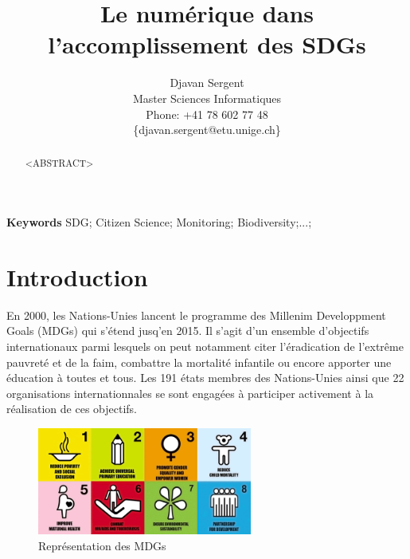 \documentclass[10pt, conference, compsocconf]{llncs}
\begin{document}
%
\title{Le numérique dans\\l'accomplissement des SDGs}





% 
\author{Djavan Sergent \\
Master Sciences Informatiques \\
Phone: +41 78 602 77 48 \\
 \{djavan.sergent@etu.unige.ch\}}




\maketitle


\begin{abstract}
	<ABSTRACT>
\end{abstract}


\textbf{Keywords}
SDG; Citizen Science; Monitoring; Biodiversity;...;




\section{Introduction}\label{sec:introduction}

		En 2000, les Nations-Unies lancent le programme des Millenim Developpment Goals (MDGs) qui s'étend jusq'en 2015. Il s'agit d'un ensemble d'objectifs internationaux parmi lesquels on peut notamment citer l'éradication de l'extrême pauvreté et de la faim, combattre la mortalité infantile ou encore apporter une éducation à toutes et tous. Les 191 états membres des Nations-Unies ainsi que 22 organisations internationnales se sont engagées à participer activement à la réalisation de ces objectifs.
\begin{figure}
	\begin{center}
		\includegraphics[width=200pt]{mdgs-full.png}
	\end{center}
	\caption{Représentation des MDGs}
\end{figure}
\end{document}
